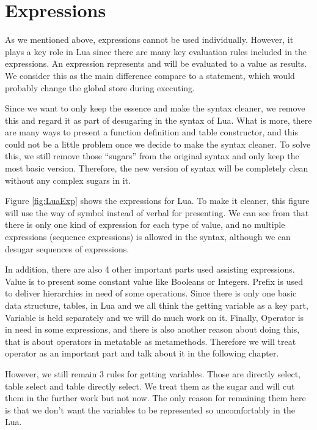 \section{Expressions}
As we mentioned above, expressions cannot be used individually. However, it plays a key role in Lua since there are many key evaluation rules included in the expressions. An expression represents and will be evaluated to a value as results. We consider this as the main difference compare to a statement, which would probably change the global store during executing.

Since we want to only keep the essence and make the syntax cleaner, we remove this and regard it as part of desugaring in the syntax of Lua. What is more, there are many ways to present a function definition and table constructor, and this could not be a little problem once we decide to make the syntax cleaner. To solve this, we still remove those ``sugars'' from the original syntax and only keep the most basic version. Therefore, the new version of syntax will be completely clean without any complex sugars in it.

Figure \ref{fig:LuaExp} shows the expressions for Lua. To make it cleaner, this figure will use the way of symbol instead of verbal for presenting. We can see from that there is only one kind of expression for each type of value, and no multiple expressions (sequence expressions) is allowed in the syntax, although we can desugar sequences of expressions.

In addition, there are also 4 other important parts used assisting expressions. Value is to present some constant value like Booleans or Integers. Prefix is used to deliver hierarchies in need of some operations. Since there is only one basic data structure, tables, in Lua and we all think the getting variable as a key part, Variable is held separately and we will do much work on it. Finally, Operator is in need in some expressions, and there is also another reason about doing this, that is about operators in metatable as metamethods. Therefore we will treat operator as an important part and talk about it in the following chapter. 

However, we still remain 3 rules for getting variables. Those are directly select, table select and table directly select. We treat them as the sugar and will cut them in the further work but not now. The only reason for remaining them here is that we don't want the variables to be represented so uncomfortably in the Lua.

